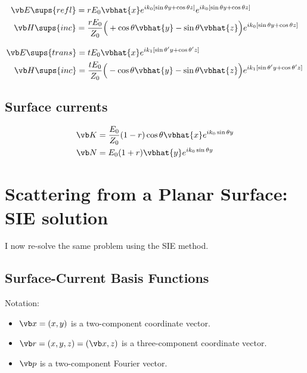 \documentclass{article}
\begin{document}
\begin{align*}
\vb E\sups{refl} 
 &= rE_0 \vbhat{x} e^{ik_0[\sin\theta y + \cos\theta z]}
    e^{ik_0[\sin\theta y + \cos\theta z]} \\
\vb H\sups{inc} 
 &= \frac{rE_0}{Z_0} \Big( +\cos\theta\vbhat{y} - \sin\theta\vbhat{z}\Big)
    e^{ik_0[\sin\theta y + \cos\theta z]} \\
\end{align*}

\begin{align*}
\vb E\sups{trans} 
 &= tE_0 \vbhat{x} 
    e^{ik_1[\sin\theta^\prime y + \cos\theta^\prime z]} \\
\vb H\sups{inc} 
 &= \frac{tE_0}{Z_0} \Big( -\cos\theta\vbhat{y} - \sin\theta\vbhat{z}\Big)
    e^{ik_1[\sin\theta^\prime y + \cos\theta^\prime z]} \\
\end{align*}

\subsection*{Surface currents}

\begin{align*}
  \vb K &= \frac{E_0}{Z_0} (1-r)\cos\theta \vbhat{x} e^{ik_0 \sin \theta y}
\\
  \vb N &= E_0 (1+r) \vbhat{y} e^{ik_0 \sin \theta y}
\end{align*}


\newpage
\section{Scattering from a Planar Surface: SIE solution}

I now re-solve the same problem using the SIE method.

\subsection{Surface-Current Basis Functions}

Notation: 

\begin{itemize}
 \item $\vb x =(x,y)$ is a two-component coordinate vector.
 \item $\vb r =(x,y,z)=(\vb x, z)$ is a three-component coordinate vector.
 \item $\vb p  $ is a two-component Fourier vector.
\end{itemize}
\end{document}
